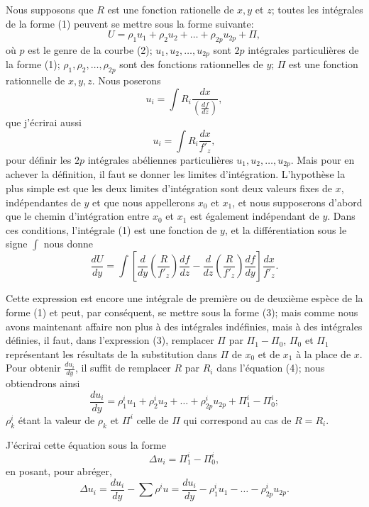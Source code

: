 \documentclass{article}
\begin{document}
Nous supposons que $R$ est une fonction rationelle de $x, y$ et $z$; toutes les intégrales de la forme (1) peuvent se mettre sous la forme suivante:
\[
U = \rho_{1} u_{1} + \rho_{2} u_{2} + \ldots + \rho_{2p} u_{2p} + \Pi, \tag{3}
\]
où $p$ est le genre de la courbe (2); $u_{1}, u_{2}, \ldots, u_{2p}$ sont $2p$ intégrales particulières de la forme (1); $\rho_{1}, \rho_{2}, \ldots, \rho_{2p}$ sont des fonctions rationnelles de $y$; $\Pi$ est une fonction rationnelle de $x, y, z$. Nous poserons
\[
u_{i} = \int R_{i} \frac{dx}{\left(\frac{df}{dz}\right)},
\]
que j'écrirai aussi
\[
u_{i} = \int R_{i} \frac{dx}{f'_{z}},
\]
pour définir les $2p$ intégrales abéliennes particulières $u_{1}, u_{2}, \ldots, u_{2p}$. Mais pour en achever la définition, il faut se donner les limites d'intégration. L'hypothèse la plus simple est que les deux limites d'intégration sont deux valeurs fixes de $x$, indépendantes de $y$ et que nous appellerons $x_{0}$ et $x_{1}$, et nous supposerons d'abord que le chemin d'intégration entre $x_{0}$ et $x_{1}$ est également indépendant de $y$. Dans ces conditions, l'intégrale (1) est une fonction de $y$, et la différentiation
sous le signe $\displaystyle\int$ nous donne
\[
\frac{dU}{dy} = \int \left[ \frac{d}{dy}\left(\frac{R}{f'_{z}}\right)\frac{df}{dz} - \frac{d}{dz}\left(\frac{R}{f'_{z}}\right)\frac{df}{dy} \right] \frac{dx}{f'_{z}}. \tag{4}
\]

Cette expression est encore une intégrale de première ou de deuxième espèce de la forme (1) et peut, par conséquent, se mettre sous la forme (3); mais comme nous avons maintenant affaire non plus à des intégrales indéfinies, mais à des intégrales définies, il faut, dans l'expression (3), remplacer $\Pi$ par $\Pi_{1} - \Pi_{0}$, $\Pi_{0}$ et $\Pi_{1}$ représentant les résultats de la substitution dans $\Pi$ de $x_{0}$ et de $x_{1}$ à la place de $x$. Pour obtenir $\displaystyle\frac{du_{i}}{dy}$, il suffit de remplacer $R$ par $R_{i}$ dans l'équation (4); nous obtiendrons ainsi
\[
\frac{du_{i}}{dy} = \rho_{1}^{i} u_{1} + \rho_{2}^{i} u_{2} + \ldots + \rho_{2p}^{i} u_{2p} + \Pi_{1}^{i} - \Pi_{0}^{i}; \tag{5}
\]
$\rho_{k}^{i}$ étant la valeur de $\rho_{k}$ et $\Pi^{i}$ celle de $\Pi$ qui correspond au cas de $R = R_{i}$.

J'écrirai cette équation sous la forme
\[
\Delta u_{i} = \Pi_{1}^{i} - \Pi_{0}^{i}, \tag{5 a}
\]
en posant, pour abréger,
\[
\Delta u_{i} = \frac{du_{i}}{dy} - \sum \rho^{i} u = \frac{du_{i}}{dy} - \rho_{1}^{i} u_{1} - \ldots - \rho_{2p}^{i} u_{2p}.
\]
\end{document}
